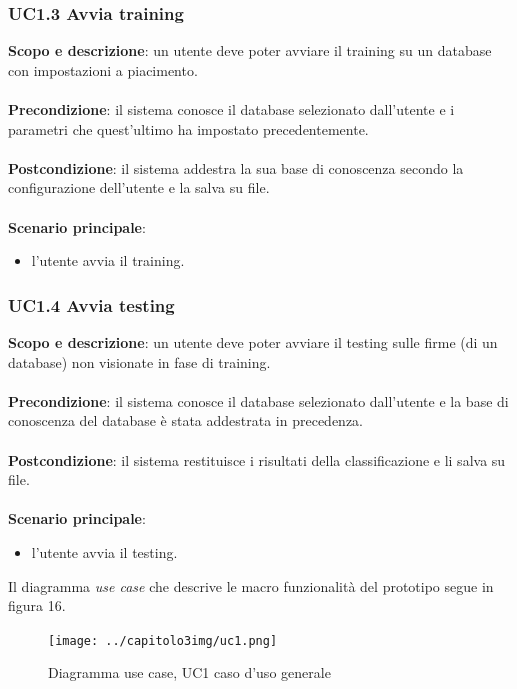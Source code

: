 \subsubsection*{UC1.3 Avvia training}
\label{3.2.1.2}
\textbf{Scopo e descrizione}: un utente deve poter avviare il training su un database con impostazioni a piacimento.\\\\
\textbf{Precondizione}: il sistema conosce il database selezionato dall'utente e i parametri che quest'ultimo ha impostato precedentemente.\\\\
\textbf{Postcondizione}: il sistema addestra la sua base di conoscenza secondo la configurazione dell'utente e la salva su file.\\\\
\textbf{Scenario principale}:
\begin{itemize}
\item l'utente avvia il training.
\end{itemize}
\subsubsection*{UC1.4 Avvia testing}
\label{3.2.1.3}
\textbf{Scopo e descrizione}: un utente deve poter avviare il testing sulle firme (di un database) non visionate in fase di training.\\\\
\textbf{Precondizione}: il sistema conosce il database selezionato dall'utente e la base di conoscenza del database è stata addestrata in precedenza.\\\\
\textbf{Postcondizione}: il sistema restituisce i risultati della classificazione e li salva su file.\\\\
\textbf{Scenario principale}:
\begin{itemize}
\item l'utente avvia il testing.
\end{itemize}
Il diagramma \emph{use case} che descrive le macro funzionalità del prototipo segue in figura 16.
\begin{figure}[H]
\centering
\texttt{[image: ../capitolo3img/uc1.png]}
\caption{Diagramma use case, UC1 caso d'uso generale}
\end{figure}


